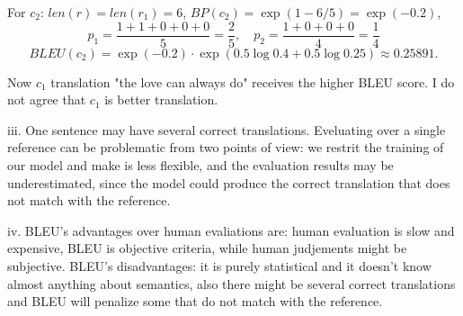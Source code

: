 \documentclass[12pt]{article}
\begin{document}
For $c_2$: $len(r) = len(r_1) = 6$, $BP(c_2) = \exp(1 - 6/5) = \exp(-0.2)$,
$$
p_1 = \frac{1 + 1 + 0 + 0 + 0}{5} = \frac{2}{5}, \quad p_2 = \frac{1 + 0 + 0 + 0}{4} = \frac{1}{4}
$$
$$
BLEU(c_2) = \exp(-0.2) \cdot \exp(0.5 \log 0.4 + 0.5 \log 0.25) \approx 0.25891.
$$

Now $c_1$ translation "the love can always do" receives the higher BLEU score. I do not agree that $c_1$ is better translation.

iii. One sentence may have several correct translations. Eveluating over a single reference can be problematic from two points of view: we restrit the training of our model and make is less flexible, and the evaluation results may be underestimated, since the model could produce the correct translation that does not match with the reference.

iv. BLEU's advantages over human evaliations are: human evaluation is slow and expensive, BLEU is objective criteria, while human judjements might be subjective. BLEU's disadvantages: it is purely statistical and it doesn't know almost anything about semantics, also there might be several correct translations and BLEU will penalize some that do not match with the reference.
\end{document}
